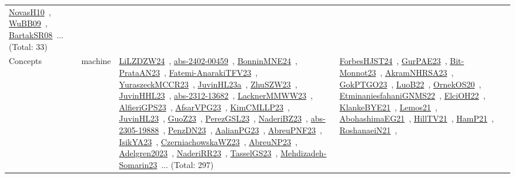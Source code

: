 {\begin{longtable}{lp{3cm}>{\raggedright\arraybackslash}p{6cm}>{\raggedright\arraybackslash}p{6cm}>{\raggedright\arraybackslash}p{8cm}}
\href{../works/NovasH10.pdf}{NovasH10}~\cite{NovasH10}, \href{../works/WuBB09.pdf}{WuBB09}~\cite{WuBB09}, \href{../works/BartakSR08.pdf}{BartakSR08}~\cite{BartakSR08}... (Total: 33)\\
Concepts & machine & \href{../works/LiLZDZW24.pdf}{LiLZDZW24}~\cite{LiLZDZW24}, \href{../works/abs-2402-00459.pdf}{abs-2402-00459}~\cite{abs-2402-00459}, \href{../works/BonninMNE24.pdf}{BonninMNE24}~\cite{BonninMNE24}, \href{../works/PrataAN23.pdf}{PrataAN23}~\cite{PrataAN23}, \href{../works/Fatemi-AnarakiTFV23.pdf}{Fatemi-AnarakiTFV23}~\cite{Fatemi-AnarakiTFV23}, \href{../works/YuraszeckMCCR23.pdf}{YuraszeckMCCR23}~\cite{YuraszeckMCCR23}, \href{../works/JuvinHL23a.pdf}{JuvinHL23a}~\cite{JuvinHL23a}, \href{../works/ZhuSZW23.pdf}{ZhuSZW23}~\cite{ZhuSZW23}, \href{../works/JuvinHHL23.pdf}{JuvinHHL23}~\cite{JuvinHHL23}, \href{../works/abs-2312-13682.pdf}{abs-2312-13682}~\cite{abs-2312-13682}, \href{../works/LacknerMMWW23.pdf}{LacknerMMWW23}~\cite{LacknerMMWW23}, \href{../works/AlfieriGPS23.pdf}{AlfieriGPS23}~\cite{AlfieriGPS23}, \href{../works/AfsarVPG23.pdf}{AfsarVPG23}~\cite{AfsarVPG23}, \href{../works/KimCMLLP23.pdf}{KimCMLLP23}~\cite{KimCMLLP23}, \href{../works/JuvinHL23.pdf}{JuvinHL23}~\cite{JuvinHL23}, \href{../works/GuoZ23.pdf}{GuoZ23}~\cite{GuoZ23}, \href{../works/PerezGSL23.pdf}{PerezGSL23}~\cite{PerezGSL23}, \href{../works/NaderiBZ23.pdf}{NaderiBZ23}~\cite{NaderiBZ23}, \href{../works/abs-2305-19888.pdf}{abs-2305-19888}~\cite{abs-2305-19888}, \href{../works/PenzDN23.pdf}{PenzDN23}~\cite{PenzDN23}, \href{../works/AalianPG23.pdf}{AalianPG23}~\cite{AalianPG23}, \href{../works/AbreuPNF23.pdf}{AbreuPNF23}~\cite{AbreuPNF23}, \href{../works/IsikYA23.pdf}{IsikYA23}~\cite{IsikYA23}, \href{../works/CzerniachowskaWZ23.pdf}{CzerniachowskaWZ23}~\cite{CzerniachowskaWZ23}, \href{../works/AbreuNP23.pdf}{AbreuNP23}~\cite{AbreuNP23}, \href{../works/Adelgren2023.pdf}{Adelgren2023}~\cite{Adelgren2023}, \href{../works/NaderiRR23.pdf}{NaderiRR23}~\cite{NaderiRR23}, \href{../works/TasselGS23.pdf}{TasselGS23}~\cite{TasselGS23}, \href{../works/Mehdizadeh-Somarin23.pdf}{Mehdizadeh-Somarin23}~\cite{Mehdizadeh-Somarin23}... (Total: 297) & \href{../works/ForbesHJST24.pdf}{ForbesHJST24}~\cite{ForbesHJST24}, \href{../works/GurPAE23.pdf}{GurPAE23}~\cite{GurPAE23}, \href{../works/Bit-Monnot23.pdf}{Bit-Monnot23}~\cite{Bit-Monnot23}, \href{../works/AkramNHRSA23.pdf}{AkramNHRSA23}~\cite{AkramNHRSA23}, \href{../works/GokPTGO23.pdf}{GokPTGO23}~\cite{GokPTGO23}, \href{../works/LuoB22.pdf}{LuoB22}~\cite{LuoB22}, \href{../works/OrnekOS20.pdf}{OrnekOS20}~\cite{OrnekOS20}, \href{../works/EtminaniesfahaniGNMS22.pdf}{EtminaniesfahaniGNMS22}~\cite{EtminaniesfahaniGNMS22}, \href{../works/ElciOH22.pdf}{ElciOH22}~\cite{ElciOH22}, \href{../works/KlankeBYE21.pdf}{KlankeBYE21}~\cite{KlankeBYE21}, \href{../works/Lemos21.pdf}{Lemos21}~\cite{Lemos21}, \href{../works/AbohashimaEG21.pdf}{AbohashimaEG21}~\cite{AbohashimaEG21}, \href{../works/HillTV21.pdf}{HillTV21}~\cite{HillTV21}, \href{../works/HamP21.pdf}{HamP21}~\cite{HamP21}, \href{../works/RoshanaeiN21.pdf}{RoshanaeiN21}~\cite{RoshanaeiN21}, 
\end{longtable}}
